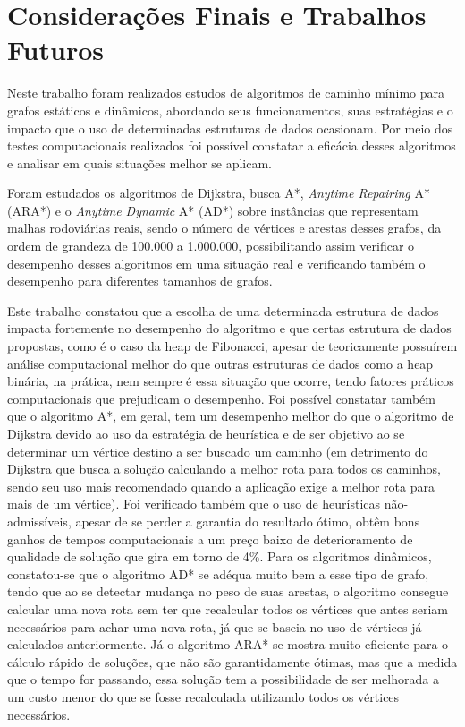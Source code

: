 \chapter{Considerações Finais e Trabalhos Futuros}
\label{sec-conclusao}

Neste trabalho foram realizados estudos de algoritmos de caminho mínimo para grafos estáticos e dinâmicos, abordando seus funcionamentos, suas estratégias e o impacto que o uso de determinadas estruturas de dados ocasionam. Por meio dos testes computacionais realizados foi possível constatar a eficácia desses algoritmos e analisar em quais situações melhor se aplicam.

Foram estudados os algoritmos de Dijkstra, busca A*, \textit{Anytime Repairing} A* (ARA*) e o \textit{Anytime Dynamic} A* (AD*) sobre instâncias que representam malhas rodoviárias reais, sendo o número de vértices e arestas desses grafos, da ordem de grandeza de 100.000 a 1.000.000, possibilitando assim verificar o desempenho desses algoritmos em uma situação real e verificando também o desempenho para diferentes tamanhos de grafos.

Este trabalho constatou que a escolha de uma determinada estrutura de dados impacta fortemente no desempenho do algoritmo e que certas estrutura de dados propostas, como é o caso da heap de Fibonacci, apesar de teoricamente possuírem análise computacional melhor do que outras estruturas de dados como a heap binária, na prática, nem sempre é essa situação que ocorre, tendo fatores práticos computacionais que prejudicam o desempenho. Foi possível constatar também que o algoritmo A*, em geral, tem um desempenho melhor do que o algoritmo de Dijkstra devido ao uso da estratégia de heurística e de ser objetivo ao se determinar um vértice destino a ser buscado um caminho (em detrimento do Dijkstra que busca a solução calculando a melhor rota para todos os caminhos, sendo seu uso mais recomendado quando a aplicação exige a melhor rota para mais de um vértice). Foi verificado também que o uso de heurísticas não-admissíveis, apesar de se perder a garantia do resultado ótimo, obtêm bons ganhos de tempos computacionais a um preço baixo de deterioramento de qualidade de solução que gira em torno de 4\%. Para os algoritmos dinâmicos, constatou-se que o algoritmo AD* se adéqua muito bem a esse tipo de grafo, tendo que ao se detectar mudança no peso de suas arestas, o algoritmo consegue calcular uma nova rota sem ter que recalcular todos os vértices que antes seriam necessários para achar uma nova rota, já que se baseia no uso de vértices já calculados anteriormente. Já o algoritmo ARA* se mostra muito eficiente para o cálculo rápido de soluções, que não são garantidamente ótimas, mas que a medida que o tempo for passando, essa solução tem a possibilidade de ser melhorada a um custo menor do que se fosse recalculada utilizando todos os vértices necessários.

